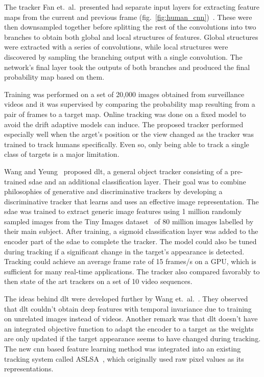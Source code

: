 The tracker Fan et.~al.~presented had separate input layers for extracting feature
maps from the current and previous frame (fig.~\ref{fig:human_cnn})~\cite{HUMAN_CNN}.
These were then downsampled together before splitting the rest of the convolutions
into two branches to obtain both global and local structures of features. Global
structures were extracted with a series of convolutions, while local structures were
discovered by sampling the branching output with a single convolution. The network's
final layer took the outputs of both branches and produced the final probability map
based on them.~\cite{HUMAN_CNN}

Training was performed on a set of 20,000 images obtained from surveillance videos and it
was supervised by comparing the probability map resulting from a pair of frames to a
target map. Online tracking was done on a fixed model to avoid the drift adaptive models
can induce. The proposed tracker performed especially well when the arget's position or
the view changed as the tracker was trained to track humans specifically. Even so, only
being able to track a single class of targets is a major limitation.~\cite{HUMAN_CNN}

Wang and Yeung~\cite{DLT} proposed \ac{dlt}, a general object tracker consisting of a
pre-trained \ac{sdae} and an additional classification layer. Their goal was to combine
philosophies of generative and discriminative trackers by developing a discriminative
tracker that learns and uses an effective image representation. The \ac{sdae} was
trained to extract generic image features using 1 million randomly sampled images from
the Tiny Images dataset~\cite{TINY_IMAGES} of 80 million images labelled by their main
subject. After training, a sigmoid classification layer was added to the encoder part
of the \ac{sdae} to complete the tracker. The model could also be tuned during tracking
if a significant change in the target's appearance is detected. Tracking could achieve
an average frame rate of 15 frames/s on a GPU, which is sufficient for many real-time
applications. The tracker also compared favorably to then state of the art trackers on
a set of 10 video sequences.

The ideas behind \ac{dlt} were developed further by Wang et.~al.~\cite{LEARNED_HIERARCH}.
They observed that \ac{dlt} couldn't obtain deep features with temporal invariance due to
training on unrelated images instead of videos. Another remark was that \ac{dlt} doesn't
have an integrated objective function to adapt the encoder to a target as the weights are
only updated if the target appearance seems to have changed during tracking. The new
\ac{cnn} based feature learning method was integrated into an existing tracking system
called ASLSA~\cite{ASLSA}, which originally used raw pixel values as its representations.


